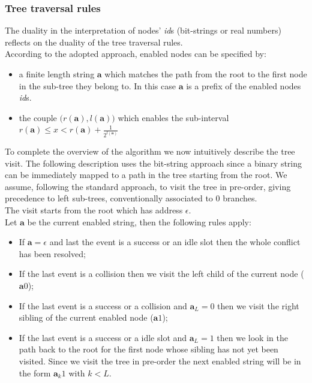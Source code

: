 \documentclass[11pt,a4paper,twoside,openright]{book}
\begin{document}
\subsubsection{Tree traversal rules}
The duality in the interpretation of nodes' \emph{id}s (bit-strings or real numbers) reflects on the duality of the tree traversal rules.\\
According to the adopted approach, enabled nodes can be specified by:
\begin{itemize}
\item a finite length string $\mathbf{a}$ which matches the path from  the root to the first node in the sub-tree they belong to. In this case $\mathbf{a}$ is a prefix  of the enabled nodes \emph{id}s.
\item the couple $ \big(r(\mathbf{a}),l(\mathbf{a})\big)$ which enables the sub-interval $r(\mathbf{a})\leq x <r(\mathbf{a})+{\displaystyle{\frac{1}{2^{l(\mathbf{a})}}}}$
\end{itemize}

To complete the overview of the algorithm we now intuitively describe the tree visit. The following description uses the bit-string approach since a binary string can be immediately mapped to a path in the tree starting from the root.
We assume, following the standard approach, to visit the tree in pre-order, giving precedence to left sub-trees, conventionally associated to 0 branches.\\
The visit starts from the root which has address $\epsilon$.\\
Let $\mathbf{a}$ be the current enabled string, then the following rules apply:
\begin{itemize}
\item If $\mathbf{a}=\epsilon$ and last the event is  a success or an idle slot then the whole conflict has been resolved;
\item If the last event is a collision then we visit the left child of the current node ($\mathbf{a}0$);
\item If the last event is a success or a collision and $\mathbf{a}_{L}=0$ then we visit the right sibling of the current enabled node ($\mathbf{a}1$);
\item If the last event is a success or a idle slot and $\mathbf{a}_{L}=1$ then we look in the path back to the root for the first node whose sibling has not yet been visited. Since we visit the tree in pre-order the next enabled string will be in the form $\mathbf{a}_{k}1$ with $k<L$.
\end{itemize}
\end{document}

